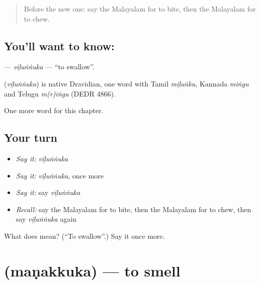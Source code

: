 \label{lesson:ML-C266-vilunnuka}



\begin{quote}
Before the new one: say the Malayalam for to bite, then the Malayalam for to chew.
\end{quote}

\subsection*{You'll want to know: }
\textbf{} — \emph{viḻuṅṅuka} — \textquotedblleft{}to swallow\textquotedblright{}.

\begin{cousinweb}
\textbf{} (\emph{viḻuṅṅuka}) is native Dravidian, one word with Tamil \emph{miḻuṅku}, Kannada \emph{miṅgu} and Telugu \emph{m(r)iṅgu} (DEDR 4866).
\end{cousinweb}

\begin{grammarlens}[title={What you've built}]
One more word for this chapter.
\end{grammarlens}

\subsection*{Your turn}
\begin{itemize}
\raggedright
  \item \emph{Say it:} \emph{viḻuṅṅuka}
  \item \emph{Say it:} \emph{viḻuṅṅuka}, once more
  \item \emph{Say it:} say \emph{viḻuṅṅuka}
  \item \emph{Recall:} say the Malayalam for to bite, then the Malayalam for to chew, then say \emph{viḻuṅṅuka} again
\end{itemize}

\begin{tcolorbox}[breakable,colback=teal!4,colframe=teal!35!black,title={Before you move on}]
What does  mean? (\textquotedblleft{}To swallow\textquotedblright{}.) Say it once more.
\end{tcolorbox}
\section[\texorpdfstring{\ml{മണക്കുക} (maṇakkuka)}{മണക്കുക (maṇakkuka)}]{ (maṇakkuka) — to smell}

\label{lesson:ML-C266-manakkuka}



